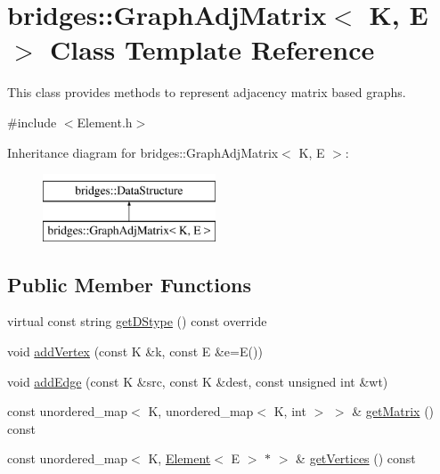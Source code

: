 \hypertarget{classbridges_1_1_graph_adj_matrix}{}\section{bridges\+:\+:Graph\+Adj\+Matrix$<$ K, E $>$ Class Template Reference}
\label{classbridges_1_1_graph_adj_matrix}


This class provides methods to represent adjacency matrix based graphs.  




{\ttfamily \#include $<$Element.\+h$>$}

Inheritance diagram for bridges\+:\+:Graph\+Adj\+Matrix$<$ K, E $>$\+:\begin{figure}[H]
\begin{center}
\leavevmode
\includegraphics[height=2.000000cm]{classbridges_1_1_graph_adj_matrix}
\end{center}
\end{figure}
\subsection*{Public Member Functions}
\begin{DoxyCompactItemize}
\item 
virtual const string \hyperlink{classbridges_1_1_graph_adj_matrix_a174dc9df7605c66abe4610943a793c99}{get\+D\+Stype} () const override
\item 
void \hyperlink{classbridges_1_1_graph_adj_matrix_a7d0c2f70e4030d903b4ecea2ac3b564a}{add\+Vertex} (const K \&k, const E \&e=E())
\item 
void \hyperlink{classbridges_1_1_graph_adj_matrix_a98accd921cace9f9d9cff0925aa1e3b2}{add\+Edge} (const K \&src, const K \&dest, const unsigned int \&wt)
\item 
const unordered\+\_\+map$<$ K, unordered\+\_\+map$<$ K, int $>$ $>$ \& \hyperlink{classbridges_1_1_graph_adj_matrix_a074539c082e58f3ed89e2b5ad281ede3}{get\+Matrix} () const
\item 
const unordered\+\_\+map$<$ K, \hyperlink{classbridges_1_1_element}{Element}$<$ E $>$ $\ast$ $>$ \& \hyperlink{classbridges_1_1_graph_adj_matrix_a66ca65ceecdb2b30209749330c0a8971}{get\+Vertices} () const
\end{DoxyCompactItemize}


